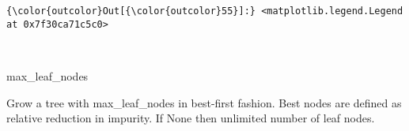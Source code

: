 \documentclass[11pt]{article}
\begin{document}
\begin{Verbatim}[commandchars=\\\{\}]
{\color{outcolor}Out[{\color{outcolor}55}]:} <matplotlib.legend.Legend at 0x7f30ca71c5c0>
\end{Verbatim}
            
    \begin{center}
    \end{center}
    { \hspace*{\fill} \\}
    
    max\_leaf\_nodes

Grow a tree with max\_leaf\_nodes in best-first fashion. Best nodes are
defined as relative reduction in impurity. If None then unlimited number
of leaf nodes.


    
    
    
    
\end{document}
